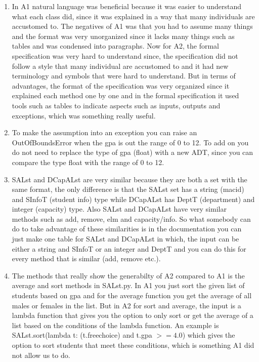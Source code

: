 \documentclass[12pt]{article}
\begin{document}
\begin{enumerate}

\item In A1 natural language was beneficial because it was easier to understand what each class did, since it was explained in a way that many individuals are accustomed to. The negatives of A1 was that you had to assume many things and the format was very unorganized since it lacks many things such as tables and was condensed into paragraphs. Now for A2, the formal specification was very hard to understand since, the specification did not follow a style that many individual are accustomed to and it had new terminology and symbols that were hard to understand. But in terms of advantages, the format of the specification was very organized since it explained each method one by one and in the formal specification it used tools such as tables to indicate aspects such as inputs, outputs and exceptions, which was something really useful.
\item To make the assumption into an exception you can raise an OutOfBoundsError when the gpa is out the range of 0 to 12. To add on you do not need to replace the type of gpa (float) with a new ADT, since you can compare the type float with the range of 0 to 12.
\item SALst and DCapALst are very similar because they are both a set with the same format, the only difference is that the SALst set has a string (macid) and SInfoT (student info) type while DCapALst has DeptT (department) and integer (capacity) type. Also SALst and DCapALst have very similar methods such as add, remove, elm and capacity/info. So what somebody can do to take advantage of these similarities is in the documentation you can just make one table for SALst and DCapALst in which, the input can be either a string and SInfoT or an integer and DeptT and you can do this for every method that is similar (add, remove etc.).
\item The methods that really show the generabilty of A2 compared to A1 is the average and sort methods in SALst.py. In A1 you just sort the given list of students based on gpa and for the average function you get the average of all males or females in the list. But in A2 for sort and average, the input is a lambda function that gives you the option to only sort or get the average of a list based on the conditions of the lambda function. An example is SALst.sort(lambda t: (t.freechoice) and t.gpa $>= 4.0$) which gives the option to sort students that meet these conditions, which is something A1 did not allow us to do.

\end{enumerate}
\end{document}
